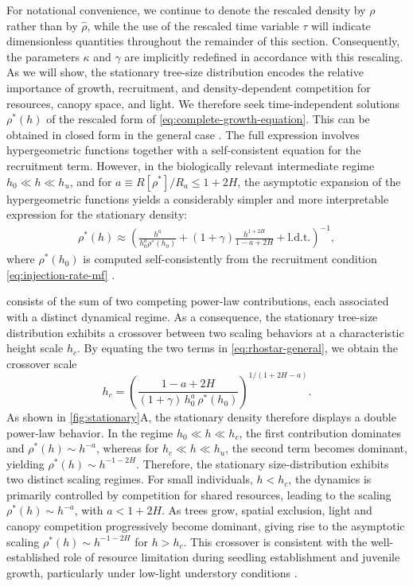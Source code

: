\documentclass[aps,pre,twocolumn,superscriptaddress,10pt]{revtex4-2}
\begin{document}
For notational convenience, we continue to denote the rescaled density by $\rho$ rather than by $\hat\rho$, while the use of the rescaled time variable $\tau$ will indicate dimensionless quantities throughout the remainder of this section. Consequently, the parameters $\kappa$ and $\gamma$ are implicitly redefined in accordance with this rescaling. 
As we will show, the stationary tree-size distribution encodes the relative importance of growth, recruitment, and density-dependent competition for resources, canopy space, and light. We therefore seek time-independent solutions $\rho^*(h)$ of the rescaled form of \cref{eq:complete-growth-equation}.
This can be obtained in closed form in the general case \MMnoref. The full expression involves hypergeometric functions together with a self-consistent equation for the recruitment term. However, in the biologically relevant intermediate regime
$h_0 \ll h \ll h_u$, and for \(a \equiv R[\rho^*]/R_a\leq 1+2H\), the asymptotic expansion of the hypergeometric functions yields a considerably simpler and more interpretable expression for the stationary density:
\begin{align}
 \rho^*(h) \approx \left( \frac{h^a}{h_0^a \rho^*(h_0)} + (1+\gamma)\frac{h^{1+2H}}{1-a+2H} + \text{l.d.t.}\right)^{-1}, \label{eq:rhostar-general}
\end{align}
where $\rho^*(h_0)$ is computed self-consistently from the recruitment condition \cref{eq:injection-rate-mf} \MMnoref.

 consists of the sum of two competing power-law contributions, each associated with a distinct dynamical regime. As a consequence, the stationary tree-size distribution exhibits a crossover between two scaling behaviors at a characteristic height scale $h_c$.
By equating the two terms in \cref{eq:rhostar-general}, we obtain the crossover scale 
\begin{equation}
h_c = \left( \frac{1-a+2H}{(1+\gamma)\, h_0^a \,\rho^*(h_0)} \right)^{1/\left(1+2H-a\right)}.
\label{eq:crossover-term}
\end{equation}
As shown in \cref{fig:stationary}A, the stationary density therefore displays a double power-law behavior. In the regime $h_0 \ll h \ll h_c$, the first contribution dominates and $\rho^*(h)\sim h^{-a}$, whereas for $h_c \ll h \ll h_u$, the second term becomes dominant, yielding $\rho^*(h)\sim h^{-1-2H}$.
Therefore, the stationary size-distribution exhibits two distinct scaling regimes. For small individuals, $h<h_c$, the dynamics is primarily controlled by competition for shared resources, leading to the scaling $\rho^*(h)\sim h^{-a}$, with $a<1+2H$. As trees grow, spatial exclusion, light and canopy competition progressively become dominant, giving rise to the asymptotic scaling $\rho^*(h)\sim h^{-1-2H}$ for $h>h_c$.
This crossover is consistent with the well-established role of resource limitation during seedling establishment and juvenile growth, particularly under low-light understory conditions \cite{Tilman1982,PoorterKitajima2007,Zhu2025}.
\end{document}

